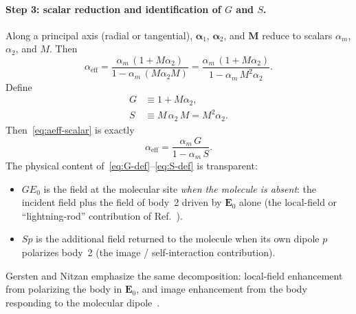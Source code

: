 \documentclass[11pt,a4paper]{article}
\begin{document}
\paragraph{Step 3: scalar reduction and identification of $G$ and $S$.}
Along a principal axis (radial or tangential), $\boldsymbol{\alpha}_1$, $\boldsymbol{\alpha}_2$,
and $\mathbf{M}$ reduce to scalars $\alpha_m$, $\alpha_2$, and $M$.  Then
\begin{equation}
  \alpha_{\mathrm{eff}}
  =
  \frac{\alpha_m\,(1+M\alpha_2)}{1-\alpha_m\,(M\alpha_2 M)}
  =
  \frac{\alpha_m\,(1+M\alpha_2)}{1-\alpha_m\,M^2\alpha_2}.
  \label{eq:aeff-scalar}
\end{equation}
Define
\begin{align}
  G
  &\equiv
  1 + M\alpha_2,
  \label{eq:G-def} \\[0.25em]
  S
  &\equiv
  M\,\alpha_2\,M
  =
  M^2\alpha_2.
  \label{eq:S-def}
\end{align}
Then~\eqref{eq:aeff-scalar} is exactly
\begin{equation}
  \alpha_{\mathrm{eff}}
  =
  \frac{\alpha_m\, G}{1 - \alpha_m\, S}.
  \label{eq:aeff-GS}
\end{equation}
The physical content of~\eqref{eq:G-def}--\eqref{eq:S-def} is transparent:
\begin{itemize}[leftmargin=1.4em]
  \item $G E_0$ is the field at the molecular site \emph{when the molecule is absent}:
        the incident field plus the field of body~2 driven by $\mathbf{E}_0$ alone
        (the local-field or ``lightning-rod'' contribution of Ref.~).
  \item $S p$ is the additional field returned to the molecule when its own dipole
        $p$ polarizes body~2 (the image / self-interaction contribution).
\end{itemize}
Gersten and Nitzan emphasize the same decomposition: local-field enhancement
from polarizing the body in $\mathbf{E}_0$, and image enhancement from the body
responding to the molecular dipole~\citep{gersten1980}.
\end{document}
